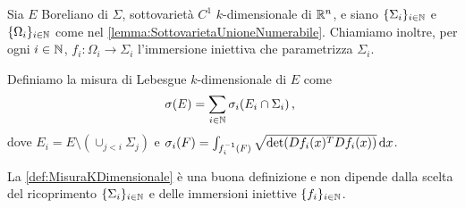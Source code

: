 \begin{definition}\label{def:MisuraKDimensionale}
	Sia $E$ Boreliano di $\Sigma$, sottovarietà $C^1$ $k$-dimensionale di $\mathbb R^n$, e siano $\{\Sigma_i\}_{i\in\mathbb N}$ e $\{\Omega_i\}_{i\in\mathbb N}$ come nel \cref{lemma:SottovarietaUnioneNumerabile}. Chiamiamo inoltre, per ogni $i\in\mathbb N$, $f_i:\Omega_i\to\Sigma_i$ l'immersione iniettiva che parametrizza $\Sigma_i$.
	
	Definiamo la misura di Lebesgue $k$-dimensionale di $E$ come
	\begin{equation*}
		\sigma(E)=\sum_{i\in\mathbb N} \sigma_i(E_i\cap \Sigma_i)\, \text{, }
	\end{equation*}
	dove $E_i=E\setminus (\cup_{j<i}\Sigma_j)$ e $\sigma_i(F)=\int_{f_i^{-1}(F)}\sqrt{\det(Df_i(x)^TDf_i(x))} \,\mathrm d x$.
\end{definition}
\begin{theorem}
	La \cref{def:MisuraKDimensionale} è una buona definizione e non dipende dalla scelta del ricoprimento $\{\Sigma_i\}_{i\in\mathbb N}$ e delle immersioni iniettive $\{f_i\}_{i\in\mathbb N}$.
\end{theorem}
